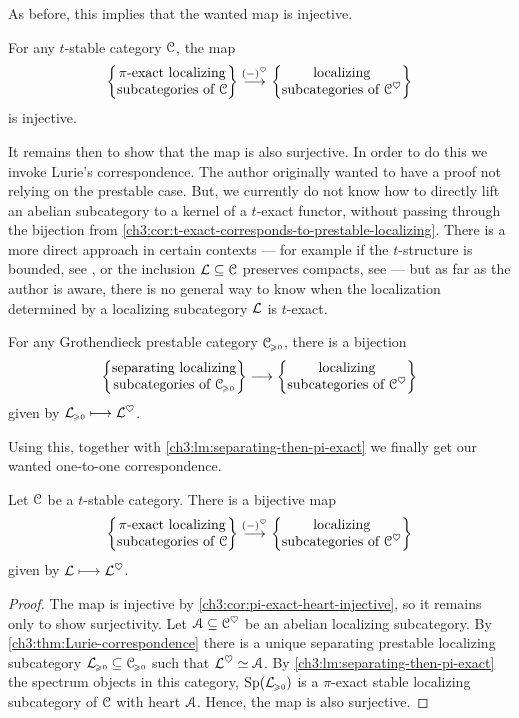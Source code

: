 As before, this implies that the wanted map is injective. 

\begin{corollary}
    \label{ch3:cor:pi-exact-heart-injective}
    For any $t$-stable category $\C$, the map
    \[\piexact \overset{(-)^\heart}\to \ablocalizing\]
    is injective. 
\end{corollary}

It remains then to show that the map is also surjective. In order to do this we invoke Lurie's correspondence. The author originally wanted to have a proof not relying on the prestable case. But, we currently do not know how to directly lift an abelian subcategory to a kernel of a $t$-exact functor, without passing through the bijection from \cref{ch3:cor:t-exact-corresponds-to-prestable-localizing}. There is a more direct approach in certain contexts --- for example if the $t$-structure is bounded, see \cite[2.20]{antieau-gepner-heller_2019}, or the inclusion $\L\subseteq \C$ preserves compacts, see \cite[2.7]{hennion-porta-vezzosi_2016} --- but as far as the author is aware, there is no general way to know when the localization determined by a localizing subcategory $\L$ is $t$-exact. 

\begin{theorem}
    \label{ch3:thm:Lurie-correspondence}
    For any Grothendieck prestable category $\C\geqz$, there is a bijection 
    \[\separating \to \ablocalizing\]
    given by $\L\geqz\longmapsto \L^\heart$. 
\end{theorem}

Using this, together with \cref{ch3:lm:separating-then-pi-exact} we finally get our wanted one-to-one correspondence. 

\begin{theorem}
    \label{ch3:thm:main}
    Let $\C$ be a $t$-stable category. There is a bijective map
    \[\piexact\overset{(-)^\heart}\to \ablocalizing\]
    given by $\L\longmapsto \L^\heart$. 
\end{theorem}
\begin{proof}
    The map is injective by \cref{ch3:cor:pi-exact-heart-injective}, so it remains only to show surjectivity. Let $\A\subseteq \C^\heart$ be an abelian localizing subcategory. By \cref{ch3:thm:Lurie-correspondence} there is a unique separating prestable localizing subcategory $\L\geqz \subseteq \C\geqz$ such that $\L^\heart \simeq \A$. By \cref{ch3:lm:separating-then-pi-exact} the spectrum objects in this category, $\Sp(\L\geqz)$ is a $\pi$-exact stable localizing subcategory of $\C$ with heart $\A$. Hence, the map is also surjective. 
\end{proof}

